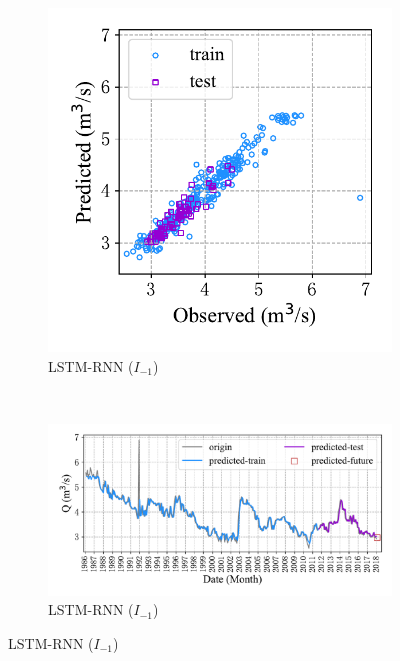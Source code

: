 \begin{figure}[!htbp]
  \centering
  \begin{subfigure}[b]{0.305\textwidth}
    \includegraphics[width=\textwidth]{Img/chap4_spr/in_only/spr_scatter_in_1_out_1_lstm_only.pdf}
    \vspace{-1.2cm}
    \caption{LSTM-RNN ($I_{-1}$)}
    \label{fig:spr_scatter_in_1_out_1_lstm_only}
  \end{subfigure}
  ~
  \begin{subfigure}[b]{0.615\textwidth}
    \includegraphics[width=\textwidth]{Img/chap4_spr/in_only/spr_series_in_1_out_1_lstm_only.pdf}
    \vspace{-1.2cm}
    \caption{LSTM-RNN ($I_{-1}$)}
    \label{fig:spr_series_in_1_out_1_lstm_only}

\end{subfigure}
\end{figure}
